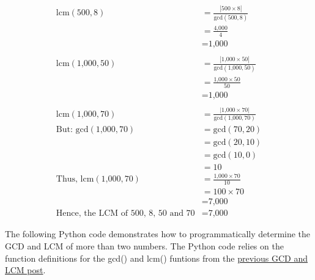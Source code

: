 \documentclass[
]{book}
\begin{document}
\[
\begin{aligned}
\text{lcm}(500, 8) &= \frac{|500 \times 8|}{\text{gcd}(500, 8)} \\
 &= \frac{\text{4,000}}{4} \\
 &= \text{1,000} \\
 \\
\text{lcm}(\text{1,000}, 50) &= \frac{|\text{1,000} \times 50|}{\text{gcd}(\text{1,000}, 50)} \\
 &= \frac{\text{1,000} \times 50}{50} \\
 &= \text{1,000} \\
 \\
\text{lcm}(\text{1,000}, 70) &= \frac{|\text{1,000} \times 70|}{\text{gcd}(\text{1,000}, 70)} \\
\text{But: gcd}(\text{1,000}, 70) &= \text{gcd}(70, 20) \\
 &= \text{gcd}(20, 10) \\
 &= \text{gcd}(10, 0) \\
 &= 10 \\
\text{Thus, lcm}(\text{1,000}, 70) &= \frac{\text{1,000} \times 70}{10} \\
 &= 100 \times 70 \\
 &= \text{7,000} \\
\text{Hence, the LCM of 500, 8, 50 and 70} &= \text{7,000}
\end{aligned}
\]

The following Python code demonstrates how to programmatically determine the GCD and LCM of more than two numbers. The Python code relies on the function definitions for the gcd() and lcm() funtions from the \href{https://sneurocode.github.io/math-explorations/gcd-and-lcm-1.html}{previous GCD and LCM post}.
\end{document}
